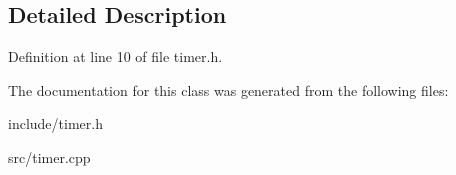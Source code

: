 \subsection{Detailed Description}


Definition at line 10 of file timer.\+h.



The documentation for this class was generated from the following files\+:\begin{DoxyCompactItemize}
\item 
include/timer.\+h\item 
src/timer.\+cpp\end{DoxyCompactItemize}
